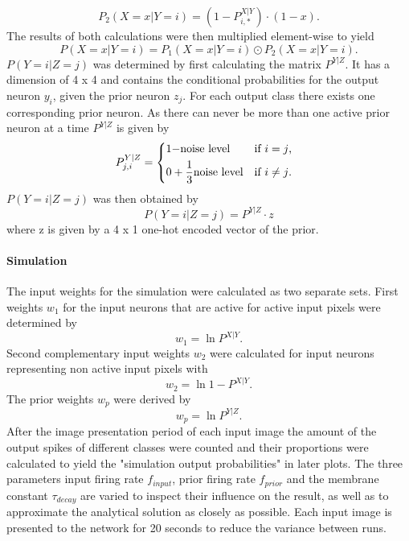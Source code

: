 \begin{equation}
\label{eqn:p2minusXvorausgesetztYMalX}
P_2(X = x|Y = i) = (1 - P^{X|Y}_{i,*}) \cdot (1 - x).
\end{equation}
The results of both calculations were then multiplied element-wise to yield
\begin{equation}
\label{eqn:pXvorausgesetztY}
P(X = x|Y = i) = P_1(X = x|Y = i) \odot P_2(X = x|Y = i).
\end{equation}
$P(Y=i|Z=j)$ was determined by first calculating the matrix $P^{Y|Z}$. It has a dimension of 4 x 4 and contains the conditional probabilities for the output neuron $y_i$, given the prior neuron $z_j$. For each output class there exists one corresponding prior neuron. As there can never be more than one active prior neuron at a time $P^{Y|Z}$ is given by
\begin{equation}
\label{eqn:PYvorausgesetztZIf}
P_{j,i}^{Y|Z} = \begin{dcases*} 1 - $noise level$ & if $i = j$, \\
0 +  \frac{1}{3}  $noise level$ & \text{if $i \neq j$. } \end{dcases*}\end{equation} 
$P(Y=i|Z=j)$ was then obtained by
\begin{equation}
\label{eqn:pYvorausgesetztZ}
P(Y=i|Z=j) = P^{Y|Z} \cdot z
\end{equation}
where z is given by a 4 x 1 one-hot encoded vector of the prior.

\paragraph{Simulation}
The input weights for the simulation were calculated as two separate sets. First weights $w_1$ for the input neurons that are active for active input pixels were determined by 
\begin{equation}
\label{eqn:1DWeights}
w_1 = \ln{P^{X|Y}}.
\end{equation}
Second complementary input weights $w_2$ were calculated for  input neurons representing non active input pixels with
\begin{equation}
\label{eqn:1DWeightsComplementary}
w_2 = \ln{1 - P^{X|Y}}.
\end{equation} 
The prior weights $w_p$ were derived by 
\begin{equation}
\label{eqn:1DWeightsPrior}
w_p = \ln{P^{Y|Z}}.
\end{equation}
After the image presentation period of each input image the amount of the output spikes of different classes were counted and their proportions were calculated to yield the "simulation output probabilities" in later plots. The three parameters input firing rate $f_{input}$, prior firing rate $f_{prior}$ and the membrane constant $\tau_{decay}$ are varied to inspect their influence on the result, as well as to approximate the analytical solution as closely as possible. Each input image is presented to the network for 20 seconds to reduce the variance between runs.


